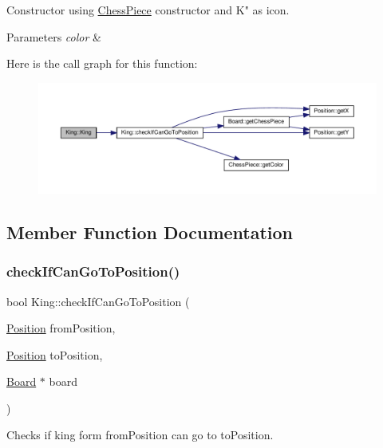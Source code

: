 Constructor using \hyperlink{classChessPiece}{Chess\+Piece} constructor and \textquotesingle{}K" as icon. 


\begin{DoxyParams}{Parameters}
{\em color} & \\
\hline
\end{DoxyParams}
Here is the call graph for this function\+:
\nopagebreak
\begin{figure}[H]
\begin{center}
\leavevmode
\includegraphics[width=350pt]{classKing_a39c7835e28a746800a290c3fb6501c92_cgraph}
\end{center}
\end{figure}


\subsection{Member Function Documentation}
\mbox{\label{classKing_ab9e40ed32cfc93fec76a831d2087fa78}} 
\subsubsection{\texorpdfstring{check\+If\+Can\+Go\+To\+Position()}{checkIfCanGoToPosition()}}
{\footnotesize\ttfamily bool King\+::check\+If\+Can\+Go\+To\+Position (\begin{DoxyParamCaption}\item[{\hyperlink{classPosition}{Position}}]{from\+Position,  }\item[{\hyperlink{classPosition}{Position}}]{to\+Position,  }\item[{\hyperlink{classBoard}{Board} $\ast$}]{board }\end{DoxyParamCaption})\hspace{0.3cm}{\ttfamily [virtual]}}



Checks if king form from\+Position can go to to\+Position. 


